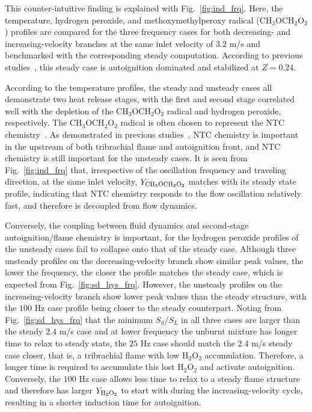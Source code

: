 \documentclass[review,3p,times]{elsarticle}
\begin{document}
This counter-intuitive finding is explained with Fig.~\ref{fig:ind_frq}.  Here, \textcolor{Rev1}{the temperature, hydrogen peroxide, and methoxy\-methyl\-peroxy radical (CH$_3$OCH$_2$O$_2$)} profiles are compared for the three frequency cases for both decreasing- and increasing-velocity branches at the same inlet velocity of $3.2$ m/s and benchmarked with the corresponding steady computation.  According to previous studies~\cite{deng15,deng15b}, this steady case is autoignition dominated and stabilized at $Z = 0.24$.  

\textcolor{Rev1}{According to the temperature profiles, the steady and unsteady cases all demonstrate two heat release stages, with the first and second stage correlated well with the depletion of the CH$_3$OCH$_2$O$_2$ radical and hydrogen peroxide, respectively.  The CH$_3$OCH$_2$O$_2$ radical is often chosen to represent the NTC chemistry~\cite{krisman14}.  As demonstrated in previous studies~\cite{deng15,deng15b}, NTC chemistry is important in the upstream of both tribrachial flame and autoignition front, and NTC chemistry is still important for the unsteady cases.  It is seen from Fig.~\ref{fig:ind_frq} that, irrespective of the oscillation frequency and traveling direction, at the same inlet velocity, $Y_{\rm CH_3OCH_2O_2}$ matches with its steady state profile, indicating that NTC chemistry responds to the flow oscillation relatively fast, and therefore is decoupled from flow dynamics.}

\textcolor{Rev1}{Conversely, the coupling between fluid dynamics and second-stage autoignition/flame chemistry is important, for the hydrogen peroxide profiles of the unsteady cases fail to collapse onto that of the steady case.  Although three unsteady profiles on the decreasing-velocity branch show similar peak values, the lower the frequency, the closer the profile matches the steady case, which is expected from Fig.~\ref{fig:sd_hys_frq}.  However, the unsteady profiles on the increasing-velocity branch show lower peak values than the steady structure, with the $100$ Hz case profile being closer to the steady counterpart.  Noting from Fig.~\ref{fig:sd_hys_frq} that the minimum $S_d/S_L$ in all three cases are larger than the steady $2.4$ m/s case and at lower frequency the unburnt mixture has longer time to relax to steady state, the $25$ Hz case should match the $2.4$ m/s steady case closer, that is, a tribrachial flame with low H$_2$O$_2$ accumulation.  Therefore, a longer time is required to accumulate this lost H$_2$O$_2$ and activate autoignition.  Conversely, the $100$ Hz case allows less time to relax to a steady flame structure and therefore has larger $Y_{\rm H_2O_2}$ to start with during the increasing-velocity cycle, resulting in a shorter induction time for autoignition.}
\end{document}
